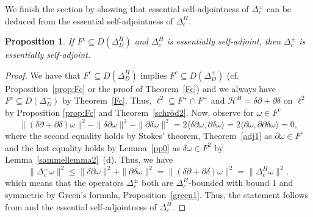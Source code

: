 \documentclass[10pt]{amsart}
\newtheorem{proposition}[theorem]{Proposition}
\theoremstyle{definition}
\newcommand{\Hmm}[1]{\leavevmode{\marginpar{\tiny%
			$\hbox to 0mm{\hspace*{-0.5mm}$\leftarrow$\hss}%
			\vcenter{\vrule depth 0.1mm height 0.1mm width \the\marginparwidth}%
			\hbox to 0mm{\hss$\rightarrow$\hspace*{-0.5mm}}$\\\relax\raggedright #1}}}
\newcommand{\eat}[1]{}
\begin{document}
 We finish the section by showing that essential self-adjointness of $\Delta^\pm_c$ can be deduced from the essential self-adjointness of $\Delta^H_c.$


\begin{proposition}\label{esssa2}
   If $F^{c}\subseteq D(\Delta_{D}^{H})$ and $\Delta^H_{c}$ is essentially self-adjoint, then $\Delta^\pm_{c}$ is essentially self-adjoint. %
\end{proposition}
\begin{proof}We have that $F^{c}\subseteq D(\Delta_{D}^{H})$ implies $F^{c}\subseteq D(\Delta_{D}^{+})$ (cf. Proposition~\ref{prop:Fc} or the proof of Theorem~\ref{Fc}) and we always have $F^{c}\subseteq D(\Delta_{D}^{-})$ by Theorem~\ref{Fc}. Thus, $\ell^2\subseteq F^+\cap F^-$ and $\mathcal{H}^H = \delta\partial+\partial\delta $ on $\ell^2$ by Proposition \ref{prop:Fc} and Theorem~\ref{schröd2}. Now, observe for $\omega\in F^{c}$
\begin{equation*}
	\|(\delta\partial+\partial\delta)\omega\|^{2}-	\|\delta\partial\omega\|^{2}-
	\|\partial\delta\omega\|^{2}= 2\langle \delta\partial \omega,\partial\delta \omega\rangle=2\langle \partial \omega,\partial\partial\delta \omega\rangle=0,
\end{equation*}	
where the second equality holds by Stokes' theorem, Theorem~\ref{adj1} as  $\partial\omega\in F^{c}$ and the last equality holds by Lemma~\ref{pp0} as $\delta\omega\in F^{2}$ by Lemma~\ref{sammellemma2}~(d).
Thus, we have
	\begin{equation*}
		\|\Delta_{c}^{\pm}\omega\|^{2} \leq  \|\delta\partial\omega\|^{2}+
		\|\partial\delta\omega\|^{2}=	\|(\delta\partial+\partial\delta)\omega\|^{2}=\|\Delta_{c}^{H}\omega\|^{2},
	\end{equation*}
	which means that the operators $ \Delta_{c}^{\pm}$ both are $\Delta_{c}^{H}$-bounded with bound $1$ and  symmetric by Green's formula, Proposition~\ref{green1}. Thus, the statement follows from \cite[Theorem~4.6]{K} and the essential self-adjointness of $\Delta_{c}^{H}$.
\eat{Furthermore, essential self-adjointness of $\Delta^{H}_{c}$ implies by the virtue of Green's formula, Theorem~\ref{green1}, and the action of $\Delta^{H}_{D}$, Theorem~\ref{action},
\begin{equation*}
	\{\omega\in\ell^{2}\mid(\delta\partial+\partial\delta)\omega\in \ell^{2}\}=D\big((\Delta^H_{c})^*\big) = D\big(\Delta^H_{D}\big). %
\end{equation*}\Hmm{Is the first equality true?}
In particular, $\partial\partial\omega=0$ whenever $\omega\in\ell^2$ and $(\partial\delta+\delta\partial)\omega\in\ell^2$.
 
}
\end{proof}
\end{document}
